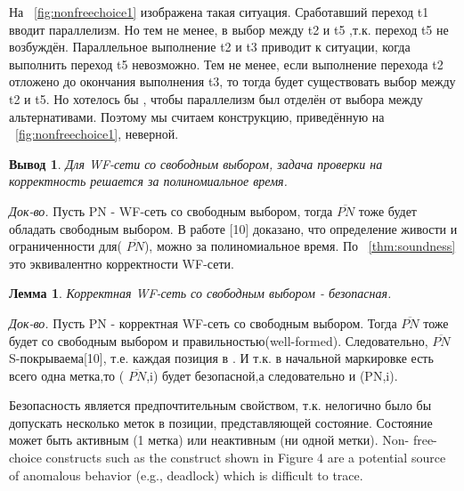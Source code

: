\documentclass[a4paper,14pt]{article}
\newtheorem{lemma}{Лемма}
\newtheorem{corollary}{Вывод}
\begin{document}
На ~\cref{fig:nonfreechoice1} изображена такая ситуация. Сработавший переход t1 вводит параллелизм. Но тем не менее, в выбор между t2 и t5 ,т.к. переход t5 не возбуждён. Параллельное выполнение t2 и t3 приводит к ситуации, когда выполнить переход t5 невозможно. Тем не менее, если выполнение перехода t2 отложено до окончания выполнения t3, то тогда будет существовать выбор между t2 и t5. Но хотелось бы , чтобы параллелизм был отделён от выбора между альтернативами. Поэтому мы считаем конструкцию, приведённую на ~\cref{fig:nonfreechoice1}, неверной.



\begin{corollary}\label{crl:freechoicesoundness}
Для WF-сети со свободным выбором, задача проверки на корректность решается за полиномиальное время. 
\end{corollary}
\textit{Док-во.} Пусть PN - WF-сеть со свободным выбором, тогда $\overline{PN}$ тоже будет обладать  свободным выбором.  В работе [10] доказано, что определение живости и ограниченности для( $\overline{PN}$), можно за полиномиальное время. По ~\cref{thm:soundness} это эквивалентно корректности WF-сети.


\begin{lemma}
Корректная WF-сеть со свободным выбором - безопасная.
\end{lemma}
\textit{Док-во.} Пусть PN - корректная WF-сеть со свободным выбором. Тогда $\overline{PN}$ тоже будет со свободным выбором и правильностью(well-formed). Следовательно, $\overline{PN}$ S-покрываема[10], т.е. каждая позиция в . И т.к. в начальной маркировке есть всего одна метка,то ( $\overline{PN}$,i) будет безопасной,а следовательно и (PN,i).



Безопасность является предпочтительным свойством, т.к. нелогично было бы допускать несколько меток в позиции, представляющей состояние. Состояние может быть активным (1 метка) или неактивным (ни одной метки). 
 Non-
free-choice constructs such as the construct shown in Figure 4 are a potential source of
anomalous behavior (e.g., deadlock) which is difficult to trace.
\end{document}
